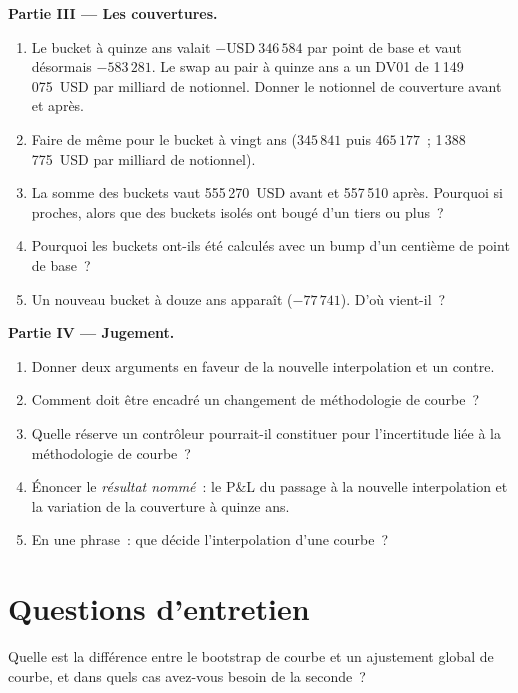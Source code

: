 \begin{problem}
\medskip\noindent\textbf{Partie III --- Les couvertures.}
\begin{enumerate}[resume]
\item Le bucket à quinze ans valait $-\text{USD}~346\,584$ par point de base et vaut désormais
$-583\,281$. Le swap au pair à quinze ans a un DV01 de 1\,149\,075~USD par milliard de notionnel.
Donner le notionnel de couverture avant et après.
\item Faire de même pour le bucket à vingt ans ($345\,841$ puis $465\,177$~; 1\,388\,775~USD
par milliard de notionnel).
\item La somme des buckets vaut 555\,270~USD avant et 557\,510 après. Pourquoi si
proches, alors que des buckets isolés ont bougé d'un tiers ou plus~?
\item Pourquoi les buckets ont-ils été calculés avec un bump d'un centième de point de base~?
\item Un nouveau bucket à douze ans apparaît ($-77\,741$). D'où vient-il~?
\end{enumerate}

\medskip\noindent\textbf{Partie IV --- Jugement.}
\begin{enumerate}[resume]
\item Donner deux arguments en faveur de la nouvelle interpolation et un contre.
\item Comment doit être encadré un changement de méthodologie de courbe~?
\item Quelle réserve un contrôleur pourrait-il constituer pour l'incertitude liée à la méthodologie de courbe~?
\item Énoncer le \emph{résultat nommé}~: le P\&L du passage à la nouvelle interpolation et la variation de la
couverture à quinze ans.
\item En une phrase~: que décide l'interpolation d'une courbe~?
\end{enumerate}
\end{problem}

\section{Questions d'entretien}

\begin{interviewq}\label{iq:rc:curve-construction:1}
Quelle est la différence entre le bootstrap de courbe et un ajustement global de courbe, et
dans quels cas avez-vous besoin de la seconde~?
\end{interviewq}

